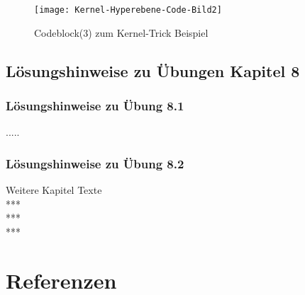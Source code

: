 \documentclass[12pt]{article}
\begin{document}
\begin{figure}[htp]
  \centering
  \hspace*{-0.5cm} 
  \texttt{[image: Kernel-Hyperebene-Code-Bild2]}
  \caption{Codeblock(3) zum Kernel-Trick Beispiel}
  \label{fig:SVM_Ebenen}
\end{figure}

\newpage

\subsection{Lösungshinweise zu Übungen Kapitel 8}

\subsubsection{Lösungshinweise zu Übung 8.1}
.....\\
\subsubsection{Lösungshinweise zu Übung 8.2}
Weitere Kapitel Texte \\
***\\
***\\
***

\newpage

\section{Referenzen}
\end{document}
